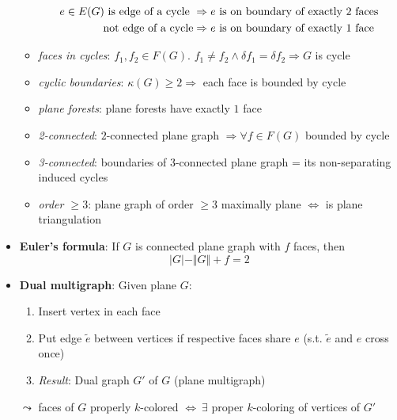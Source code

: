 \begin{itemize}
\begin{itemize}
\begin{align*}
        e \in E(G) \text{ is edge of a cycle } &\Rightarrow e \text{ is on boundary of exactly $ 2 $ faces} \\
          \text{ not edge of a cycle} &\Rightarrow e \text{ is on boundary of exactly $ 1 $ face}
      \end{align*}
      \item \emph{faces in cycles}: $ f_1, f_2 \in F(G) $. $ f_1 \neq f_2 \wedge \delta f_1 = \delta f_2 \Rightarrow G $ is cycle
      \item \emph{cyclic boundaries}: $ \kappa(G) \geq 2 \Rightarrow $ each face is bounded by cycle
    \item \emph{plane forests}: plane forests have exactly $ 1 $ face
    \item \emph{2-connected}: $ 2 $-connected plane graph $ \Rightarrow \forall f \in F(G) $ bounded by cycle
    \item \emph{3-connected}: boundaries of $ 3 $-connected plane graph = its non-separating induced cycles
    \item \emph{order $ \geq 3 $}: plane graph of order $ \geq 3 $ maximally plane $ \Leftrightarrow $ is plane triangulation
  \end{itemize}
  \item \textbf{Euler's formula}: If $ G $ is connected plane graph with $ f $ faces, then
    \begin{equation*}
      \vert G \vert - \Vert G \Vert + f = 2
    \end{equation*}
  \item \textbf{Dual multigraph}: Given plane $ G $:
  \begin{enumerate}
    \item Insert vertex in each face 
    \item Put edge $ \tilde{e} $ between vertices if respective faces share $ e $ (s.t. $ \tilde{e} $ and $ e $ cross once)
    \item \emph{Result}: Dual graph $ G' $ of $ G $ (plane multigraph)
  \end{enumerate}
  $ \leadsto $ faces of $ G $ properly $ k $-colored $ \Leftrightarrow \ \exists $ proper $ k $-coloring of vertices of $ G' $
\end{itemize}

